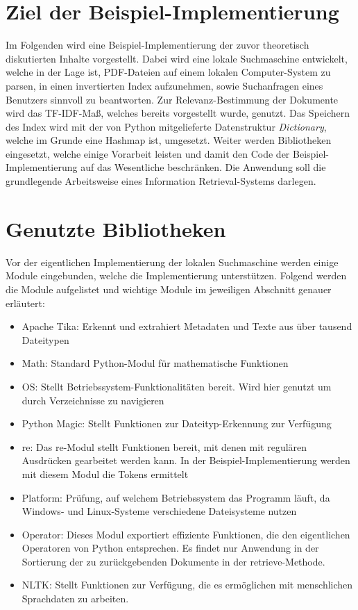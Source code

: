 \section{Ziel der Beispiel-Implementierung}\label{ziel-der-beispiel-implementierung}

Im Folgenden wird eine Beispiel-Implementierung der zuvor theoretisch diskutierten Inhalte vorgestellt. Dabei wird eine lokale Suchmaschine entwickelt, welche in der Lage ist, PDF-Dateien auf einem lokalen Computer-System zu parsen, in einen invertierten Index aufzunehmen, sowie Suchanfragen eines Benutzers sinnvoll zu beantworten. Zur Relevanz-Bestimmung der Dokumente wird das TF-IDF-Maß, welches bereits vorgestellt wurde, genutzt. Das Speichern des Index wird mit der von Python mitgelieferte Datenstruktur \textit{Dictionary}, welche im Grunde eine Hashmap ist, umgesetzt. Weiter werden Bibliotheken eingesetzt, welche einige Vorarbeit leisten und damit den Code der Beispiel-Implementierung auf das Wesentliche beschränken. Die Anwendung soll die grundlegende Arbeitsweise eines Information Retrieval-Systems darlegen.

\section{Genutzte Bibliotheken}\label{genutzte-bibliotheken}

Vor der eigentlichen Implementierung der lokalen Suchmaschine werden einige Module eingebunden, welche die Implementierung unterstützen. Folgend werden die Module aufgelistet und wichtige Module im jeweiligen Abschnitt genauer erläutert:\newpage
\begin{itemize}
	\item Apache Tika: Erkennt und extrahiert Metadaten und Texte aus über tausend Dateitypen
	\item Math: Standard Python-Modul für mathematische Funktionen
	\item OS: Stellt Betriebssystem-Funktionalitäten bereit. Wird hier genutzt um durch Verzeichnisse zu navigieren
	\item Python Magic: Stellt Funktionen zur Dateityp-Erkennung zur Verfügung
	\item re: Das re-Modul stellt Funktionen bereit, mit denen mit regulären Ausdrücken gearbeitet werden kann. In der Beispiel-Implementierung werden mit diesem Modul die Tokens ermittelt
	\item Platform: Prüfung, auf welchem Betriebssystem das Programm läuft, da Windows- und Linux-Systeme verschiedene Dateisysteme nutzen
	\item Operator: Dieses Modul exportiert effiziente Funktionen, die den eigentlichen Operatoren von Python entsprechen. Es findet nur Anwendung in der Sortierung der zu zurückgebenden Dokumente in der retrieve-Methode.
	\item NLTK: Stellt Funktionen zur Verfügung, die es ermöglichen mit menschlichen Sprachdaten zu arbeiten.
\end{itemize}

